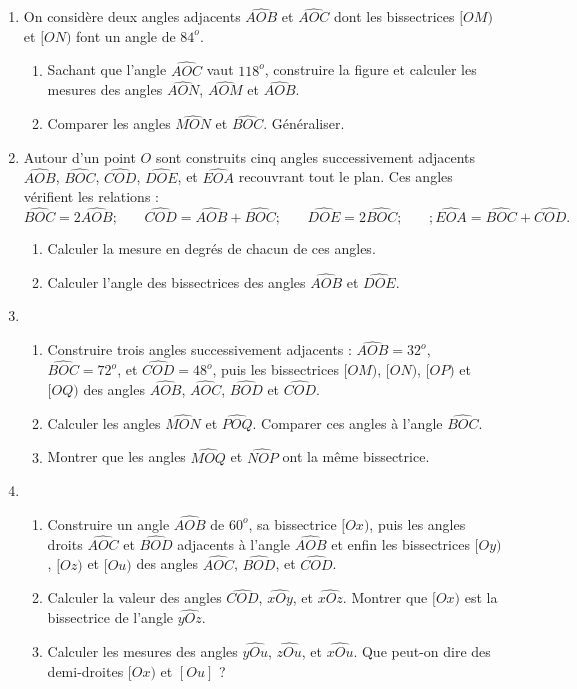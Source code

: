 \begin{enumerate}
\item On considère deux angles adjacents $\widehat{AOB}$ et $\widehat{AOC}$ dont les bissectrices $[OM)$ et $[ON)$ font un angle de $84^o$. \begin{enumerate}
\item Sachant que l'angle $\widehat{AOC}$ vaut $118^o$, construire la figure et calculer les mesures des angles $\widehat{AON}$, $\widehat{AOM}$ et $\widehat{AOB}$. 
\item Comparer les angles $\widehat{MON}$ et $\widehat{BOC}$. Généraliser.
\end{enumerate}

\item Autour d'un point $O$ sont construits cinq angles successivement adjacents $\widehat{AOB}$, $\widehat{BOC}$, $\widehat{COD}$, $\widehat{DOE}$, et $\widehat{EOA}$ recouvrant tout le plan. Ces angles
vérifient les relations : 
\[ \widehat{BOC}= 2\widehat{AOB}; \phantom{meo} \widehat{COD}= \widehat{AOB}+ \widehat{BOC}; \phantom{meo} \widehat{DOE}= 2\widehat{BOC}; \phantom{meo}; \widehat{EOA}= \widehat{BOC}+\widehat{COD}.\]
\begin{enumerate}
\item Calculer la mesure en degrés de chacun de ces angles. 
\item Calculer l'angle des bissectrices des angles $\widehat{AOB}$ et $\widehat{DOE}$. 
\end{enumerate}

\item\begin{enumerate}
\item Construire trois angles successivement adjacents : $\widehat{AOB}= 32^o$, $\widehat{BOC}= 72^o$, et $\widehat{COD}= 48^o$, puis les bissectrices $[OM)$, $[ON)$, $[OP)$ et $[OQ)$ des angles $\widehat{AOB}$, $\widehat{AOC}$, $\widehat{BOD}$ et $\widehat{COD}$. 
\item Calculer les angles $\widehat{MON}$ et $\widehat{POQ}$. Comparer
ces angles à l'angle $\widehat{BOC}$. 
\item Montrer que les angles $\widehat{MOQ}$ et $\widehat{NOP}$ ont la même bissectrice. 
\end{enumerate}

\item \begin{enumerate}
\item Construire un angle $\widehat{AOB}$ de $60^o$, sa bissectrice $[Ox)$, puis les angles droits $\widehat{AOC}$ et $\widehat{BOD}$ adjacents à l'angle $\widehat{AOB}$ et enfin les bissectrices $[Oy)$, $[Oz)$ et $[Ou)$ des angles $\widehat{AOC}$, $\widehat{BOD}$, et $\widehat{COD}$. 
\item Calculer la valeur des angles $\widehat{COD}$, $\widehat{xOy}$, et $\widehat{xOz}$. Montrer que $[Ox)$ est la bissectrice de l'angle $\widehat{yOz}$. 
\item Calculer les mesures des angles $\widehat{yOu}$, $\widehat{zOu}$, et $\widehat{xOu}$. Que peut-on dire des demi-droites $[Ox)$ et $[Ou]$ ? 
\end{enumerate}

\end{enumerate}
